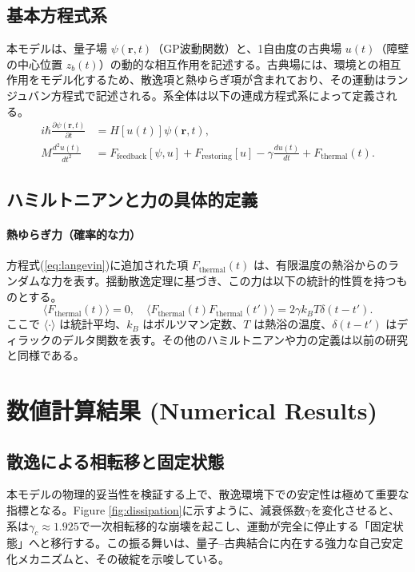 \documentclass[a4paper,11pt,ja=standard,lualatex]{bxjsarticle}
\begin{document}
\subsection{基本方程式系}
本モデルは、量子場 $\psi(\mathbf{r},t)$（GP波動関数）と、1自由度の古典場 $u(t)$（障壁の中心位置 $z_b(t)$）の動的な相互作用を記述する。古典場には、環境との相互作用をモデル化するため、散逸項と熱ゆらぎ項が含まれており、その運動はランジュバン方程式で記述される。系全体は以下の連成方程式系によって定義される。
\begin{align}
 i\hbar\frac{\partial\psi(\mathbf r,t)}{\partial t}&=H[u(t)]\psi(\mathbf r,t), \label{eq:schrodinger} \\
  M\frac{d^{2}u(t)}{dt^{2}}&=F_{\text{feedback}}[\psi,u]+F_{\text{restoring}}[u] - \gamma \frac{du(t)}{dt} + F_{\text{thermal}}(t). \label{eq:langevin}
\end{align}

\subsection{ハミルトニアンと力の具体的定義}
\paragraph{熱ゆらぎ力（確率的な力）} 
方程式(\ref{eq:langevin})に追加された項 $F_{\text{thermal}}(t)$ は、有限温度の熱浴からのランダムな力を表す。揺動散逸定理に基づき、この力は以下の統計的性質を持つものとする。
\[
\langle F_{\text{thermal}}(t) \rangle = 0, \quad \langle F_{\text{thermal}}(t) F_{\text{thermal}}(t') \rangle = 2\gamma k_B T \delta(t-t').
\]
ここで $\langle \cdot \rangle$ は統計平均、$k_B$ はボルツマン定数、$T$ は熱浴の温度、$\delta(t-t')$ はディラックのデルタ関数を表す。その他のハミルトニアンや力の定義は以前の研究と同様である。

\FloatBarrier
\section{数値計算結果 (Numerical Results)}
\subsection{散逸による相転移と固定状態}
本モデルの物理的妥当性を検証する上で、散逸環境下での安定性は極めて重要な指標となる。Figure \ref{fig:dissipation}に示すように、減衰係数$\gamma$を変化させると、系は$\gamma_c \approx 1.925$で一次相転移的な崩壊を起こし、運動が完全に停止する「固定状態」へと移行する。この振る舞いは、量子–古典結合に内在する強力な自己安定化メカニズムと、その破綻を示唆している。
\end{document}
